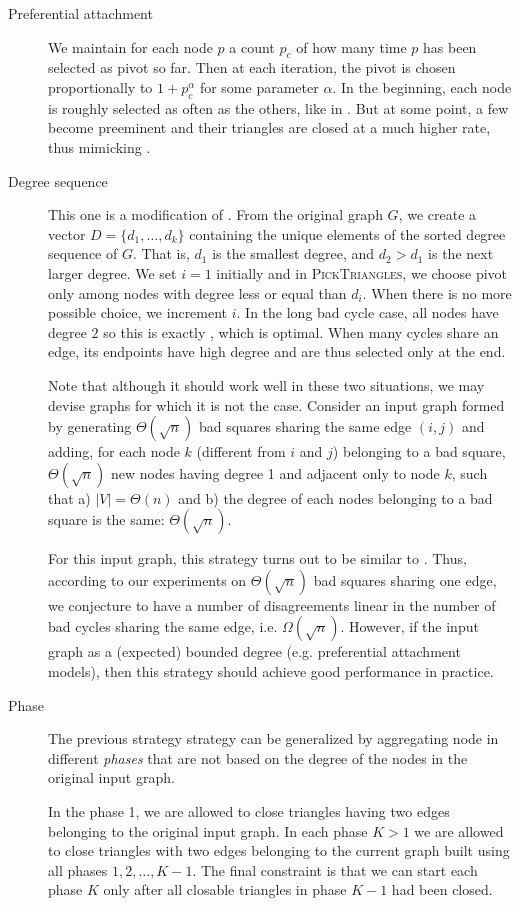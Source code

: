 \begin{description}
	\item[Preferential attachment] We maintain for each node $p$ a count
		$p_c$ of how many time $p$ has been selected as pivot so far. Then at
		each iteration, the pivot is chosen proportionally to $1+p_c^\alpha$ for
		some parameter $\alpha$.
		In the beginning, each node is roughly selected as often as the
		others, like in \pot{}. But at some point, a few become preeminent
		and their triangles are closed at a much higher rate, thus
		mimicking \pat{}.
	\item[Degree sequence] This one is a modification of \pat{}. From the
		original graph $G$, we create a vector $D=\{d_1, \ldots, d_k\}$
		containing the unique elements of the sorted degree sequence of $G$.
		That is,
		$d_1$ is the smallest degree, and $d_2 > d_1$ is the next larger  degree.
	We set $i=1$ initially and in \textsc{PickTriangles}, we choose pivot
	only among nodes with degree less or equal than $d_i$. When there is no more
	possible choice, we increment $i$. In the long bad cycle case, all nodes
	have degree $2$ so this is exactly \pat{}, which is optimal. When many
	cycles share an edge, its endpoints have high degree and are thus
	selected only at the end.

	Note that although it should work well in these two situations, we may
	devise graphs for which it is not the case. 
	Consider an input graph formed by generating $\Theta(\sqrt{n})$ bad
	squares sharing the same edge $(i,j)$ and adding, for each node $k$
	(different from $i$ and $j$) belonging to a bad square, $\Theta(\sqrt n)$
	new nodes having degree 1 and adjacent only to node $k$, such that a)
	$|V|=\Theta(n)$ and b) the degree of each nodes belonging to a bad square is
	the same: $\Theta(\sqrt{n})$.

	For this input graph, this strategy turns out to be similar to \pat{}.
	Thus, according to our experiments on $\Theta(\sqrt n)$ bad squares
	sharing one edge, we conjecture to have a number of disagreements linear
	in the number of bad cycles sharing the same edge, i.e.
	$\Omega(\sqrt{n})$. However, if the input graph as a (expected) bounded
	degree (e.g. preferential attachment models), then this strategy should
	achieve good performance in practice.

	\item[Phase] The previous strategy strategy can be generalized by
		aggregating node in different \emph{phases} that are not based on the
		degree of the nodes in the original input graph.

		In the phase 1, we are allowed to close triangles having two edges
		belonging to the original input graph. In each phase $K>1$ we are
		allowed to close triangles with two edges belonging to the current
		graph built using all phases $1,2, \ldots, K-1$. The final constraint
		is that we can start each phase $K$ only after all closable triangles
		in phase $K-1$ had been closed.
\end{description}

